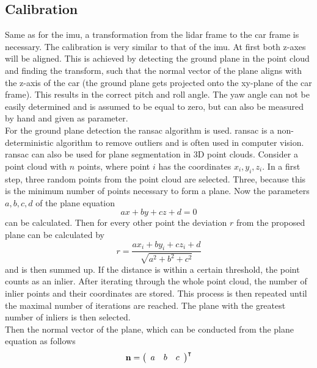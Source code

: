 \subsection{Calibration}
\label{ssec:calibration_lidar}
Same as for the \gls{imu}, a transformation from the \gls{lidar} frame to the car frame is necessary.
The calibration is very similar to that of the \gls{imu}.
At first both z-axes will be aligned.
This is achieved by detecting the ground plane in the point cloud and finding the transform, such that the normal vector of the plane aligns with the z-axis of the car (the ground plane gets projected onto the xy-plane of the car frame).
This results in the correct pitch and roll angle.
The yaw angle can not be easily determined and is assumed to be equal to zero, but can also be measured by hand and given as parameter.\\
For the ground plane detection the \gls{ransac} algorithm \cite{Fischler1981} is used.
\gls{ransac} is a non-deterministic algorithm to remove outliers and is often used in computer vision.
\gls{ransac} can also be used for plane segmentation in 3D point clouds.
Consider a point cloud with $n$ points, where point $i$ has the coordinates $x_i, y_i, z_i$.
In a first step, three random points from the point cloud are selected.
Three, because this is the minimum number of points necessary to form a plane.
Now the parameters $a, b, c, d$ of the plane equation
\begin{equation}
	ax + by + cz + d = 0
\end{equation}
can be calculated.
Then for every other point the deviation $r$ from the proposed plane can be calculated by
\begin{equation}
	r = \frac{ax_i + by_i + cz_i + d}{\sqrt{a^2 + b^2 + c^2}}
\end{equation}
and is then summed up.
If the distance is within a certain threshold, the point counts as an inlier.
After iterating through the whole point cloud, the number of inlier points and their coordinates are stored.
This process is then repeated until the maximal number of iterations are reached.
The plane with the greatest number of inliers is then selected.\\
Then the normal vector of the plane, which can be conducted from the plane equation as follows
\begin{equation}
	\vb{n} = \left(\begin{array}{lll} a & b & c \end{array}\right)^{\intercal}
\end{equation}
